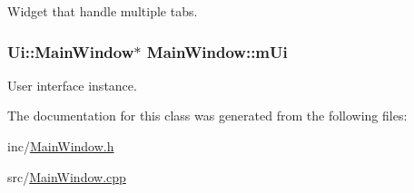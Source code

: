 Widget that handle multiple tabs. 

\hypertarget{class_main_window_ae726dc0c4cb46920180b2031664c5c93}{
\subsubsection[{m\+Ui}]{\setlength{\rightskip}{0pt plus 5cm}Ui\+::\+Main\+Window$\ast$ Main\+Window\+::m\+Ui\hspace{0.3cm}{\ttfamily [private]}}}\label{class_main_window_ae726dc0c4cb46920180b2031664c5c93}


User interface instance. 



The documentation for this class was generated from the following files\+:\begin{DoxyCompactItemize}
\item 
inc/\hyperlink{_main_window_8h}{Main\+Window.\+h}\item 
src/\hyperlink{_main_window_8cpp}{Main\+Window.\+cpp}\end{DoxyCompactItemize}
